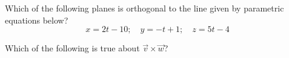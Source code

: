 \documentclass{ximera}
\author{Anna Davis}
\begin{document}
\begin{exercise}
Which of the following planes is orthogonal to the line given by parametric equations below?
$$x=2t-10;\quad y=-t+1;\quad z=5t-4$$

Which of the following is true about $\vec{v}\times \vec{w}$?
\begin{multipleChoice}
 \end{multipleChoice}
\end{exercise}
\end{document}
